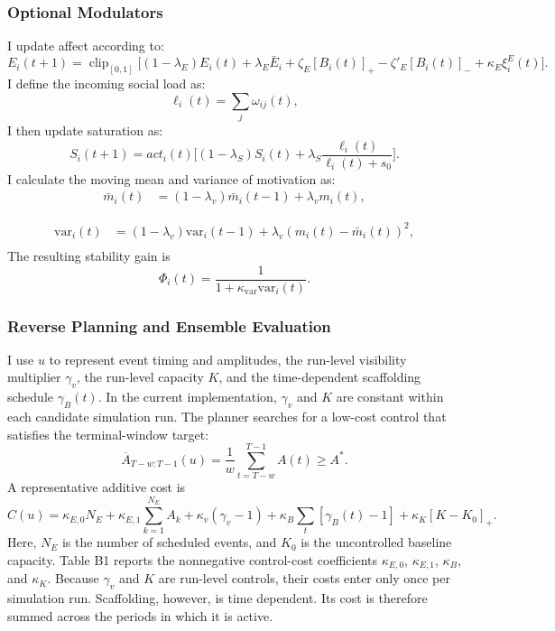 \documentclass[11pt]{article}
\newcommand{\clip}{\operatorname{clip}_{[0,1]}}
\begin{document}
\subsubsection{Optional Modulators}
I update affect according to:
\begin{equation}\tag{17}\label{eq:emotion}
E_i(t{+}1)=\clip\!\Big[(1-\lambda_E)E_i(t)+\lambda_E\bar E_i+\zeta_E[B_i(t)]_+-\zeta'_E[B_i(t)]_-+\kappa_E\xi_i^E(t)\Big].
\end{equation}
I define the incoming social load as:
\begin{equation}\tag{18a}\label{eq:saturation}
\ell_i(t)=\sum_j\omega_{ij}(t),
\end{equation}
I then update saturation as:
\begin{equation}\tag{18b}
S_i(t{+}1)=act_i(t)\Big[(1-\lambda_S)S_i(t)+\lambda_S\frac{\ell_i(t)}{\ell_i(t)+s_0}\Big].
\end{equation}
I calculate the moving mean and variance of motivation as:
\begin{equation}\tag{19a}
\begin{aligned}
\bar m_i(t)&=(1-\lambda_v)\bar m_i(t{-}1)+\lambda_vm_i(t),
\end{aligned}
\end{equation}

\begin{equation}\tag{19b}
\begin{aligned}
\mathrm{var}_i(t)&=(1-\lambda_v)\mathrm{var}_i(t{-}1)+\lambda_v(m_i(t)-\bar m_i(t))^2,\\
\end{aligned}
\end{equation}
The resulting stability gain is
\[
\Phi_i(t)=\frac{1}{1+\kappa_{\text{var}}\mathrm{var}_i(t)}.
\tag{19c}
\]
\subsubsection{Reverse Planning and Ensemble Evaluation}
I use $u$ to represent event timing and amplitudes, the run-level visibility multiplier $\gamma_v$, the run-level capacity $K$, and the time-dependent scaffolding schedule $\gamma_B(t)$. In the current implementation, $\gamma_v$ and $K$ are constant within each candidate simulation run. The planner searches for a low-cost control that satisfies the terminal-window target:
\[
\overline A_{T-w:T-1}(u)=\frac1w\sum_{t=T-w}^{T-1}A(t)\ge A^*.
\tag{20}
\]
A representative additive cost is
\[
C(u)=\kappa_{E,0}N_E+\kappa_{E,1}\sum_{k=1}^{N_E} A_k+\kappa_v(\gamma_v-1)+\kappa_B\sum_{t}[\gamma_B(t)-1]+\kappa_K[K-K_0]_+.
\]
Here, $N_E$ is the number of scheduled events, and $K_0$ is the uncontrolled baseline capacity. Table B1 reports the nonnegative control-cost coefficients $\kappa_{E,0}$, $\kappa_{E,1}$, $\kappa_B$, and $\kappa_K$. Because $\gamma_v$ and $K$ are run-level controls, their costs enter only once per simulation run. Scaffolding, however, is time dependent. Its cost is therefore summed across the periods in which it is active.
\end{document}

